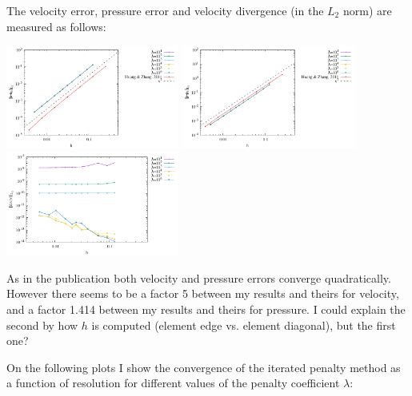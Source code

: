 The velocity error, pressure error and velocity divergence (in the $L_2$ norm) are 
measured as follows:  
\begin{center}
\includegraphics[width=5.7cm]{python_codes/fieldstone_161/results/bench2/errorsV.pdf}
\includegraphics[width=5.7cm]{python_codes/fieldstone_161/results/bench2/errorsP.pdf}
\includegraphics[width=5.7cm]{python_codes/fieldstone_161/results/bench2/errorsDivv.pdf}
\end{center}
As in the publication both velocity and pressure errors converge quadratically.
However there seems to be a factor 5 between my results and theirs for velocity, 
and a factor 1.414 between my results and theirs for pressure. I could 
explain the second by how $h$ is computed (element edge vs. element diagonal), 
but the first one?

On the following plots I show the convergence of the iterated penalty method as 
a function of resolution for different values of the penalty coefficient $\lambda$:

